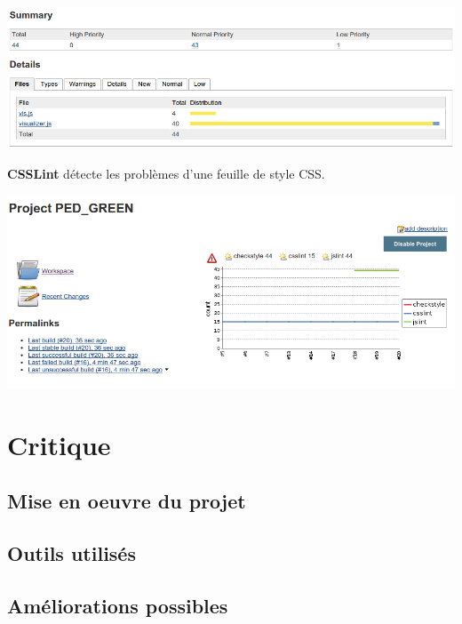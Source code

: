 \documentclass [a4paper,11pt]{article}
\begin{document}
\begin{center}
\includegraphics[scale=0.4]{img/checkstyle.png}
\end{center}

\textbf{CSSLint} détecte les problèmes d'une feuille de style CSS.

\begin{center}
\includegraphics[scale=0.4]{img/jslint.png}
\end{center}
\newpage

\section{Critique}

\subsection{Mise en oeuvre du projet}

\subsection{Outils utilisés}

\subsection{Améliorations possibles}

\newpage

\nocite{*}


\end{document}
